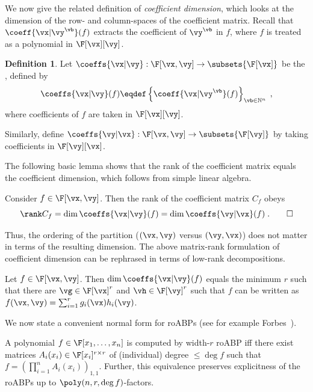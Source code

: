 \documentclass[11pt]{article}
\numberwithin{equation}{section}
\theoremstyle{definition}
\newtheorem{definition}[theorem]{Definition}
\theoremstyle{plain}
\newcommand{\N}{\mathbb N}
\begin{document}
We now give the related definition of \emph{coefficient dimension}, which looks at the dimension of the row- and column-spaces of the coefficient matrix. Recall that $\coeff{\vx|\vy^\vb}(f)$ extracts the coefficient of $\vy^\vb$ in $f$, where $f$ is treated as a polynomial in $\F[\vx][\vy]$.

\begin{definition}\label{defn:coefficient-space}
        Let $\coeffs{\vx|\vy}:\F[\vx,\vy]\to\subsets{\F[\vx]}$ be the , defined by
        \[
                \coeffs{\vx|\vy}(f)
                \eqdef
                \left\{
                        \coeff{\vx|\vy^\vb}(f)
                \right\}_{\vb\in\N^n}
                \;,
        \]
        where coefficients of $f$ are taken in $\F[\vx][\vy]$.

        Similarly, define $\coeffs{\vy|\vx}:\F[\vx,\vy]\to\subsets{\F[\vy]}$ by taking coefficients in $\F[\vy][\vx]$.
\end{definition}

The following basic lemma shows that the rank of the coefficient matrix equals the coefficient dimension, which follows from simple linear algebra.

\begin{lemmawp}\label{res:y-dim_eq-x-dim}
        Consider $f\in\F[\vx,\vy]$.  Then the rank of the coefficient matrix $C_f$ obeys
        \[
                \rank C_f
                =
                \dim\coeffs{\vx|\vy}(f)=\dim\coeffs{\vy|\vx}(f)
                \;.
                \qedhere
        \]
\end{lemmawp}

Thus, the ordering of the partition ($(\vx,\vy)$ versus $(\vy,\vx)$) does not matter in terms of the resulting dimension. The above matrix-rank formulation of coefficient dimension can be rephrased in terms of low-rank decompositions.

\begin{lemmawp}\label{res:nisan_dim-eq-width}
        Let $f\in\F[\vx,\vy]$. Then $\dim\coeffs{\vx|\vy}(f)$ equals the minimum $r$ such that there are $\vg\in\F[\vx]^r$ and $\vh\in\F[\vy]^r$ such that $f$ can be written as $f(\vx,\vy)=\sum_{i=1}^r g_i(\vx)h_i(\vy)$.
\end{lemmawp}

We now state a convenient normal form for roABPs (see for example Forbes~\cite[Corollary 4.4.2]{Forbes14}).

\begin{lemmawp}\label{res:roABP-normal-form}
        A polynomial $f\in\F[x_1,\ldots,x_n]$ is computed by width-$r$ roABP iff there exist matrices $A_i(x_{i})\in\F[x_{i}]^{r\times r}$ of (individual) degree $\le \deg f$ such that $f=(\prod_{i=1}^n A_i(x_{i}))_{1,1}$. Further, this equivalence preserves explicitness of the roABPs up to $\poly(n,r,\deg f)$-factors.
\end{lemmawp}
\end{document}
